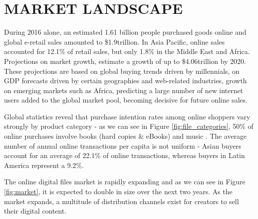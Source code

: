 
\section{MARKET LANDSCAPE} \label{landscape}
During 2016 alone, an estimated 1.61 billion people purchased goods online and global e-retail sales amounted to \$1.9trillion. In Asia Pacific, online sales accounted for 12.1\% of retail sales, but only 1.8\% in the Middle East and Africa. Projections on market growth, estimate a growth of up to \$4.06trillion by 2020. These projections are based on global buying trends driven by millennials, on  GDP forecasts  driven by certain geographies and web-related industries, growth on emerging markets such as Africa, predicting a large number of new internet users added to the global market pool, becoming decisive for future online sales.
 
Global statistics reveal that purchase intention rates among online shoppers vary strongly by product category - as we can see in Figure \ref{fig:file_categories}, 50\% of online purchases involve books (hard copies \& eBooks) and music . The average number of annual online transactions per capita is not uniform - Asian buyers account for an average of 22.1\% of online transactions, whereas buyers in Latin America represent a 9.2\%. 

The online digital files market is rapidly expanding and as we can see in Figure \ref{fig:market}, it is expected to double in size over the next two years. As the market expands, a multitude of distribution channels exist for creators to sell their digital content. 

